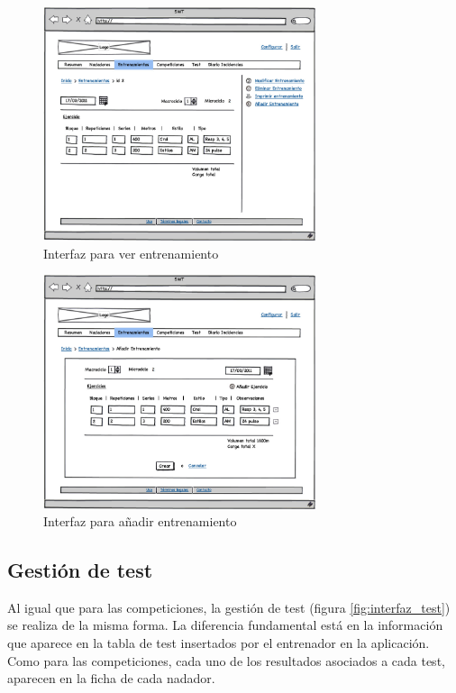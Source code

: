 		\begin{figure}[H]
		  \centering
		    \includegraphics[width=8cm]{./eps/p_interfaz/20_Entrenamientos_show.eps}
		  \caption{Interfaz para ver entrenamiento}
		  \label{fig:interfaz_competiciones_show}
		\end{figure}
	
		\begin{figure}[H]
		  \centering
		    \includegraphics[width=8cm]{./eps/p_interfaz/19_Entrenamientos_new.eps}
		  \caption{Interfaz para añadir entrenamiento}
		  \label{fig:interfaz_entrenamientos_new}
		\end{figure}

	
	\subsection{Gestión de test} %
		\label{sub:gestion_de_test}
	
	Al igual que para las competiciones, la gestión de test (figura \ref{fig:interfaz_test}) se realiza de la misma forma. La diferencia fundamental está en la información que aparece en la tabla de test insertados por el entrenador en la aplicación. Como para las competiciones, cada uno de los resultados asociados a cada test, aparecen en la ficha de cada nadador.
	
